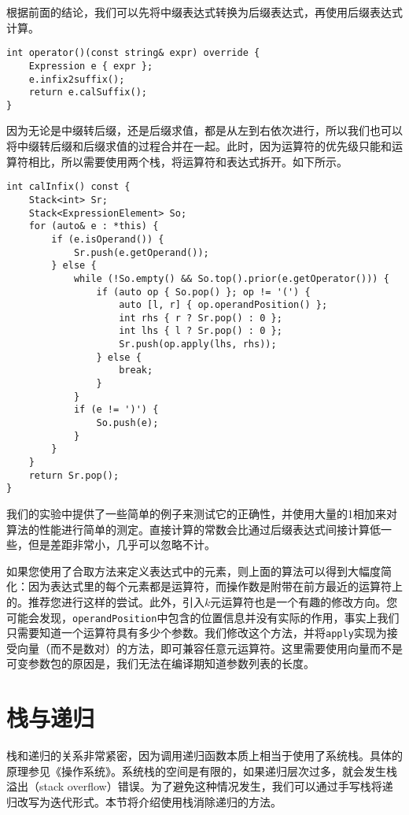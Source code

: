 根据前面的结论，我们可以先将中缀表达式转换为后缀表达式，再使用后缀表达式计算。

\begin{lstlisting}
int operator()(const string& expr) override {
    Expression e { expr };
    e.infix2suffix();
    return e.calSuffix();
}
\end{lstlisting}

因为无论是中缀转后缀，还是后缀求值，都是从左到右依次进行，所以我们也可以将中缀转后缀和后缀求值的过程合并在一起。此时，因为运算符的优先级只能和运算符相比，所以需要使用两个栈，将运算符和表达式拆开。如下所示。

\begin{lstlisting}
int calInfix() const {
    Stack<int> Sr;
    Stack<ExpressionElement> So;
    for (auto& e : *this) {
        if (e.isOperand()) {
            Sr.push(e.getOperand());
        } else {
            while (!So.empty() && So.top().prior(e.getOperator())) {
                if (auto op { So.pop() }; op != '(') {
                    auto [l, r] { op.operandPosition() };
                    int rhs { r ? Sr.pop() : 0 };
                    int lhs { l ? Sr.pop() : 0 };
                    Sr.push(op.apply(lhs, rhs));
                } else {
                    break;
                }
            }
            if (e != ')') {
                So.push(e);
            }
        }
    }
    return Sr.pop();
}
\end{lstlisting}

我们的实验中提供了一些简单的例子来测试它的正确性，并使用大量的1相加来对算法的性能进行简单的测定。直接计算的常数会比通过后缀表达式间接计算低一些，但是差距非常小，几乎可以忽略不计。

如果您使用了合取方法来定义表达式中的元素，则上面的算法可以得到大幅度简化：因为表达式里的每个元素都是运算符，而操作数是附带在前方最近的运算符上的。推荐您进行这样的尝试。此外，引入$k$元运算符也是一个有趣的修改方向。您可能会发现，\lstinline{operandPosition}中包含的位置信息并没有实际的作用，事实上我们只需要知道一个运算符具有多少个参数。我们修改这个方法，并将\lstinline{apply}实现为接受向量（而不是数对）的方法，即可兼容任意元运算符。这里需要使用向量而不是可变参数包的原因是，我们无法在编译期知道参数列表的长度。

\section{栈与递归}

栈和递归的关系非常紧密，因为调用递归函数本质上相当于使用了系统栈。具体的原理参见《操作系统》。系统栈的空间是有限的，如果递归层次过多，就会发生栈溢出（stack overflow）错误。为了避免这种情况发生，我们可以通过手写栈将递归改写为迭代形式。本节将介绍使用栈消除递归的方法。

